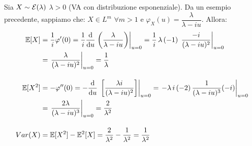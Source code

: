 \medskip
\begin{ese}
  Sia $X\sim \mathcal E (\lambda)$ $\lambda > 0$ (VA con distribuzione esponenziale).
  Da un esempio precedente, sappiamo che: $X \in L^m$ $\forall m > 1$ e $\varphi_X(u)=\dfrac{\lambda}{\lambda-iu}$. Allora:
  \begin{align*}
  \mathbb E[X]&=\dfrac{1}{i}\varphi'(0)=\dfrac{1}{i}\dfrac{\mathrm d}{\mathrm d u} \left.\left(\dfrac{\lambda}{\lambda-iu}\right) \right|_{u=0}
  = \dfrac{1}{i} \, \lambda \, (-1) \, \left. \dfrac{-i}{(\lambda-iu)^2} \right|_{u=0} \\
  &= \left.\dfrac{\lambda}{(\lambda-iu)^2}\right|_{u=0}=\dfrac{1}{\lambda}\\[1.1em]
  \mathbb E[X^2]&=-\varphi''(0)=-\dfrac{\mathrm d}{\mathrm d u} \, \left.\left[\dfrac{\lambda i}{(\lambda-iu)^2} \right] \right|_{u=0} = \left. -\lambda \, i \, (-2) \, \dfrac{1}{(\lambda-iu)^3}(-i)\right|_{u=0} \\
  &= \left.\dfrac{2\lambda}{(\lambda-iu)^3}\right|_{u=0}=\dfrac{2}{\lambda^2}\\[1.1em]
  Var(X)&=\mathbb E[X^2]-\mathbb E^2[X]=\dfrac{2}{\lambda^2}-\dfrac{1}{\lambda^2}=\dfrac{1}{\lambda^2}
  \end{align*}
\end{ese}


